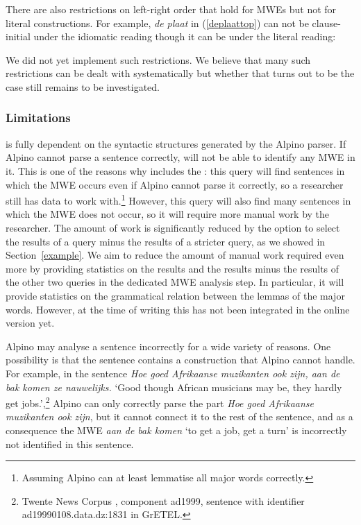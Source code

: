 \documentclass[output=paper,colorlinks,citecolor=brown]{langscibook}
\begin{document}
There are also restrictions on left-right order that hold for MWEs but not for literal constructions. For example, \textit{de plaat} in (\ref{deplaattop}) can not be clause-initial under the idiomatic reading though it can be  under the literal reading:

\begin{exe}
\end{exe}

We did not yet implement such restrictions. We believe that many such restrictions can be dealt with systematically but whether that turns out to be the case still remains to be investigated.

\subsubsection{Limitations}
\label{limitations}

 {\mwefinder} is fully dependent on the syntactic structures generated by the Alpino parser. If Alpino cannot parse a sentence correctly, {\mwefinder} will not be able to identify any MWE in it. This is one of the reasons why {\mwefinder} includes the {\supersetquery}: this query will find sentences in which the MWE occurs even if Alpino cannot parse it correctly, so a researcher still has data to work with.\footnote{Assuming Alpino can at least lemmatise all major words correctly.} However,  this query will also find many sentences in which the MWE does not occur, so it will require more manual work by the researcher. The amount of work is significantly reduced by the option to select the results of a query minus the results of a stricter query, as we showed in Section~\ref{example}. We aim to reduce the amount of manual work required even more  by providing statistics on the results and the results minus the results of the other two queries in the dedicated MWE analysis step. In particular, it will provide statistics on the grammatical relation between the lemmas of the major words. However, at the time of writing this has not been integrated in the online version yet. 

Alpino may analyse a sentence incorrectly for a wide variety of reasons. One possibility is that the sentence contains a construction that Alpino cannot handle. For example, in the sentence \textit{Hoe goed Afrikaanse muzikanten ook zijn, aan de bak komen ze nauwelijks.} `Good though African musicians may be, they hardly get jobs.',\footnote{Twente News Corpus \citep{Ordelman:2007}, component ad1999, sentence with identifier ad19990108.data.dz:1831 in GrETEL.} Alpino can only correctly parse the part \textit{Hoe goed Afrikaanse muzikanten ook zijn}, but it cannot connect it to the rest of the sentence, and as a consequence the MWE \textit{aan de bak komen} `to get a job, get a turn' is incorrectly not identified in this sentence.
\end{document}
